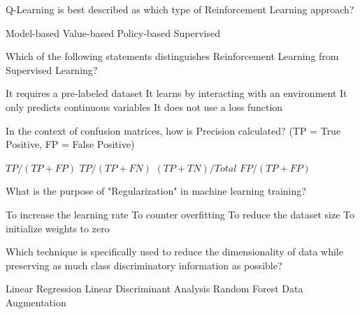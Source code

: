 \documentclass[12pt]{exam}
\begin{document}
\begin{questions}
                \question Q-Learning is best described as which type of Reinforcement Learning approach? \\ 
                \begin{oneparchoices}
                    \choice Model-based
                    \choice Value-based %
                    \choice Policy-based
                    \choice Supervised
                \end{oneparchoices}
                
                
                \question Which of the following statements distinguishes Reinforcement Learning from Supervised Learning? \\ 
                \begin{oneparchoices}
                    \choice It requires a pre-labeled dataset
                    \choice It learns by interacting with an environment %
                    \choice It only predicts continuous variables
                    \choice It does not use a loss function
                \end{oneparchoices}
                
                \question In the context of confusion matrices, how is Precision calculated? (TP = True Positive, FP = False Positive) \\ 
                \begin{oneparchoices}
                    \choice $TP / (TP + FP)$ %
                    \choice $TP / (TP + FN)$
                    \choice $(TP + TN) / Total$
                    \choice $FP / (TP + FP)$
                \end{oneparchoices}
                
                \question What is the purpose of "Regularization" in machine learning training? \\ 
                \begin{oneparchoices}
                    \choice To increase the learning rate
                    \choice To counter overfitting %
                    \choice To reduce the dataset size
                    \choice To initialize weights to zero
                \end{oneparchoices}

                \question Which technique is specifically used to reduce the dimensionality of data while preserving as much class discriminatory information as possible? \\
                \begin{oneparchoices}
                    \choice Linear Regression
                    \choice Linear Discriminant Analysis %
                    \choice Random Forest
                    \choice Data Augmentation
                \end{oneparchoices}
                

\end{questions}
\end{document}
